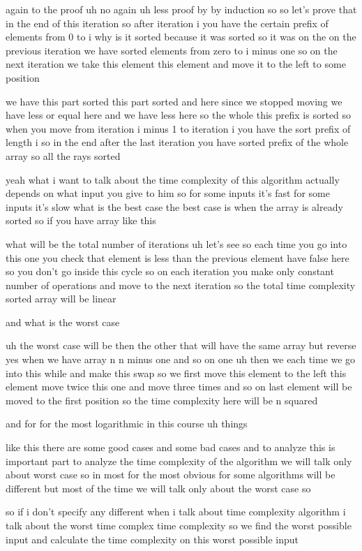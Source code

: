 again to the proof uh no again uh less proof by by induction so so let's prove that in the end of this iteration so after iteration i you have the certain prefix of elements from 0 to i why is it sorted because it was sorted so it was on the on the previous iteration we have sorted elements from zero to i minus one so on the next iteration we take this element this element and move it to the left to some position

we have this part sorted this part sorted and here since we stopped moving we have less or equal here and we have less here so the whole this prefix is sorted so when you move from iteration i minus 1 to iteration i you have the sort prefix of length i so in the end after the last iteration you have sorted prefix of the whole array so all the rays sorted

yeah what i want to talk about the time complexity of this algorithm actually depends on what input you give to him so for some inputs it's fast for some inputs it's slow what is the best case the best case is when the array is already sorted so if you have array like this

what will be the total number of iterations uh let's see so each time you go into this one you check that element is less than the previous element have false here so you don't go inside this cycle so on each iteration you make only constant number of operations and move to the next iteration so the total time complexity sorted array will be linear

and what is the worst case

uh the worst case will be then the other that will have the same array but reverse yes when we have array n n minus one and so on one uh then we each time we go into this while and make this swap so we first move this element to the left this element move twice this one and move three times and so on last element will be moved to the first position so the time complexity here will be n squared

and for for the most logarithmic in this course uh things

like this there are some good cases and some bad cases and to analyze this is important part to analyze the time complexity of the algorithm we will talk only about worst case so in most for the most obvious for some algorithms will be different but most of the time we will talk only about the worst case so

so if i don't specify any different when i talk about time complexity algorithm i talk about the worst time complex time complexity so we find the worst possible input and calculate the time complexity on this worst possible input

